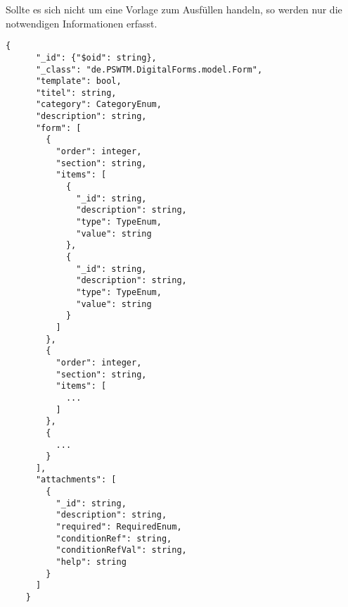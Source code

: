 Sollte es sich nicht um eine Vorlage zum Ausfüllen handeln, so werden nur die notwendigen Informationen erfasst.
\begin{lstlisting}[label={lst:lstlistingdoc}]
    {
      "_id": {"$oid": string},
      "_class": "de.PSWTM.DigitalForms.model.Form",
      "template": bool,
      "titel": string,
      "category": CategoryEnum,
      "description": string,
      "form": [
        {
          "order": integer,
          "section": string,
          "items": [
            {
              "_id": string,
              "description": string,
              "type": TypeEnum,
              "value": string
            },
            {
              "_id": string,
              "description": string,
              "type": TypeEnum,
              "value": string
            }
          ]
        },
        {
          "order": integer,
          "section": string,
          "items": [
            ...
          ]
        },
        {
          ...
        }
      ],
      "attachments": [
        {
          "_id": string,
          "description": string,
          "required": RequiredEnum,
          "conditionRef": string,
          "conditionRefVal": string,
          "help": string
        }
      ]
    }

\end{lstlisting}